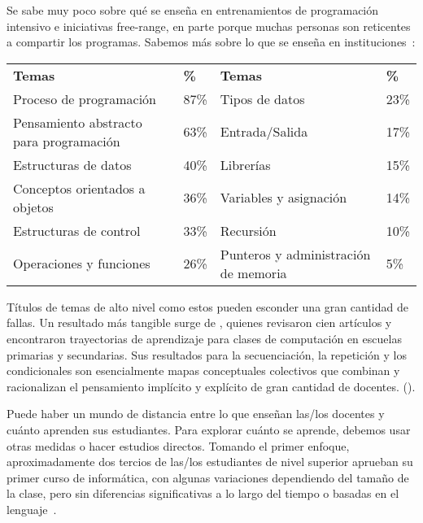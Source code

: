 
Se sabe muy poco sobre qué se enseña en entrenamientos de programación intensivo e iniciativas free-range, en parte porque muchas personas son reticentes a compartir los programas.
Sabemos más sobre lo que  se enseña en instituciones~\cite{Luxt2017}:

\begin{longtable}{llll}
\textbf{Temas}            & \textbf{\%}    & \textbf{Temas}        & \textbf{\%} \\
Proceso de programación         & 87\%        & Tipos de datos                & 23\% \\
Pensamiento abstracto para programación    & 63\%        & Entrada/Salida                  & 17\% \\
Estructuras de datos              & 40\%        & Librerías                     & 15\% \\
Conceptos orientados a objetos        & 36\%        & Variables y asignación       & 14\% \\
Estructuras de control              & 33\%        & Recursión             & 10\% \\
Operaciones y funciones         & 26\%        & Punteros y administración de memoria    &  5\%
\end{longtable}

Títulos de temas de alto nivel como estos pueden esconder una gran cantidad de fallas.
Un resultado más tangible surge de \cite{Rich2017},
quienes revisaron cien artículos y encontraron trayectorias de aprendizaje para clases de computación en escuelas primarias y secundarias.
Sus resultados para la secuenciación, la repetición y los condicionales son esencialmente mapas conceptuales colectivos
que combinan y racionalizan el pensamiento implícito y explícito de gran cantidad de docentes.
().

\newpage



Puede haber un mundo de distancia entre lo que enseñan las/los docentes y cuánto aprenden sus estudiantes.
Para explorar cuánto se aprende, debemos usar otras medidas o hacer estudios directos.
Tomando el primer enfoque, aproximadamente dos tercios de las/los estudiantes de nivel superior aprueban su primer curso de informática,
con algunas variaciones dependiendo del tamaño de la clase,
pero sin diferencias significativas a lo largo del tiempo o basadas en el lenguaje~\cite{Benn2007a,Wats2014}.

